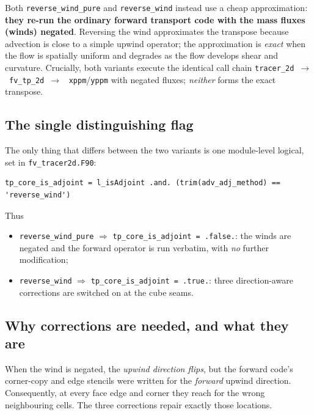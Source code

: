 \documentclass[11pt]{article}
\newcommand{\code}[1]{\texttt{#1}}
\begin{document}
Both \code{reverse\_wind\_pure} and \code{reverse\_wind} instead use a cheap
approximation: \textbf{they re-run the ordinary forward transport code with the
mass fluxes (winds) negated}. Reversing the wind approximates the transpose
because advection is close to a simple upwind operator; the approximation is
\emph{exact} when the flow is spatially uniform and degrades as the flow
develops shear and curvature. Crucially, both variants execute the identical
call chain
\code{tracer\_2d}~$\rightarrow$~\code{fv\_tp\_2d}~$\rightarrow$~
\code{xppm}/\code{yppm} with negated fluxes; \emph{neither} forms the exact
transpose.

\subsection{The single distinguishing flag}

The only thing that differs between the two variants is one module-level logical,
set in \code{fv\_tracer2d.F90}:
\begin{lstlisting}
tp_core_is_adjoint = l_isAdjoint .and. (trim(adv_adj_method) == 'reverse_wind')
\end{lstlisting}
Thus
\begin{itemize}
  \item \code{reverse\_wind\_pure} $\Rightarrow$
        \code{tp\_core\_is\_adjoint = .false.}: the winds are negated and the
        forward operator is run verbatim, with \emph{no} further modification;
  \item \code{reverse\_wind} $\Rightarrow$
        \code{tp\_core\_is\_adjoint = .true.}: three direction-aware corrections
        are switched on at the cube seams.
\end{itemize}

\subsection{Why corrections are needed, and what they are}

When the wind is negated, the \emph{upwind direction flips}, but the forward
code's corner-copy and edge stencils were written for the \emph{forward} upwind
direction. Consequently, at every face edge and corner they reach for the wrong
neighbouring cells. The three corrections repair exactly those locations.
\end{document}
